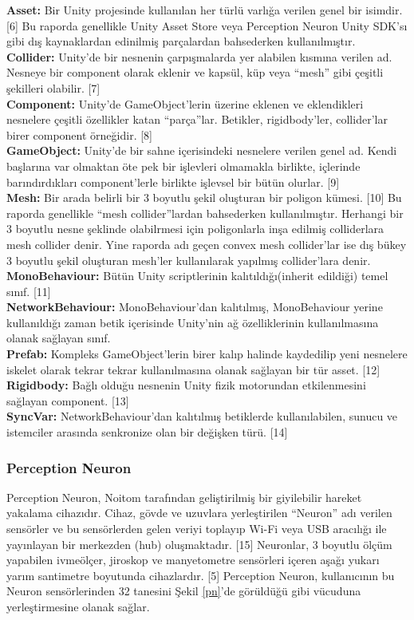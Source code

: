 \documentclass[a4paper, 12pt, titlepage]{article}
\begin{document}
\textbf{Asset:} Bir Unity projesinde kullanılan her türlü varlığa verilen genel bir isimdir. [6] Bu
raporda genellikle Unity Asset Store veya Perception Neuron Unity SDK’sı gibi dış kaynaklardan
edinilmiş parçalardan bahsederken kullanılmıştır. \\
\textbf{Collider:} Unity’de bir nesnenin çarpışmalarda yer alabilen kısmına verilen ad. Nesneye bir
component olarak eklenir ve kapsül, küp veya “mesh” gibi çeşitli şekilleri olabilir. [7] \\
\textbf{Component:} Unity’de GameObject’lerin üzerine eklenen ve eklendikleri nesnelere çeşitli
özellikler katan “parça”lar. Betikler, rigidbody’ler, collider’lar birer component örneğidir. [8]
\\
\textbf{GameObject:} Unity’de bir sahne içerisindeki nesnelere verilen genel ad. Kendi başlarına
var olmaktan öte pek bir işlevleri olmamakla birlikte, içlerinde barındırdıkları component’lerle
birlikte işlevsel bir bütün olurlar. [9] \\
\textbf{Mesh:} Bir arada belirli bir 3 boyutlu şekil oluşturan bir poligon kümesi. [10] Bu raporda
genellikle “mesh collider”lardan bahsederken kullanılmıştır. Herhangi bir 3 boyutlu nesne şeklinde
olabilrmesi için poligonlarla inşa edilmiş colliderlara mesh collider denir. Yine raporda adı geçen
convex mesh collider’lar ise dış bükey 3 boyutlu şekil oluşturan mesh’ler kullanılarak yapılmış
collider’lara denir. \\
\textbf{MonoBehaviour:} Bütün Unity scriptlerinin kalıtıldığı(inherit edildiği) temel sınıf. [11]
\\
\textbf{NetworkBehaviour:} MonoBehaviour’dan kalıtılmış, MonoBehaviour yerine kullanıldığı zaman
betik içerisinde Unity’nin ağ özelliklerinin kullanılmasına olanak sağlayan sınıf. \\
\textbf{Prefab:} Kompleks GameObject’lerin birer kalıp halinde kaydedilip yeni nesnelere iskelet
olarak tekrar tekrar kullanılmasına olanak sağlayan bir tür asset. [12] \\
\textbf{Rigidbody:} Bağlı olduğu nesnenin Unity fizik motorundan etkilenmesini sağlayan component.
[13] \\
\textbf{SyncVar:} NetworkBehaviour’dan kalıtılmış betiklerde kullanılabilen, sunucu ve istemciler
arasında senkronize olan bir değişken türü. [14] \\

\subsubsection{Perception Neuron}
Perception Neuron, Noitom tarafından geliştirilmiş bir giyilebilir hareket yakalama cihazıdır.
Cihaz, gövde ve uzuvlara yerleştirilen “Neuron” adı verilen sensörler ve bu sensörlerden gelen
veriyi toplayıp Wi-Fi veya USB aracılığı ile yayınlayan bir merkezden (hub) oluşmaktadır. [15]
Neuronlar, 3 boyutlu ölçüm yapabilen ivmeölçer, jiroskop ve manyetometre sensörleri içeren aşağı
yukarı yarım santimetre boyutunda cihazlardır. [5] Perception Neuron, kullanıcının bu Neuron
sensörlerinden 32 tanesini Şekil \ref{pn}'de görüldüğü gibi vücuduna yerleştirmesine olanak sağlar.
\end{document}
